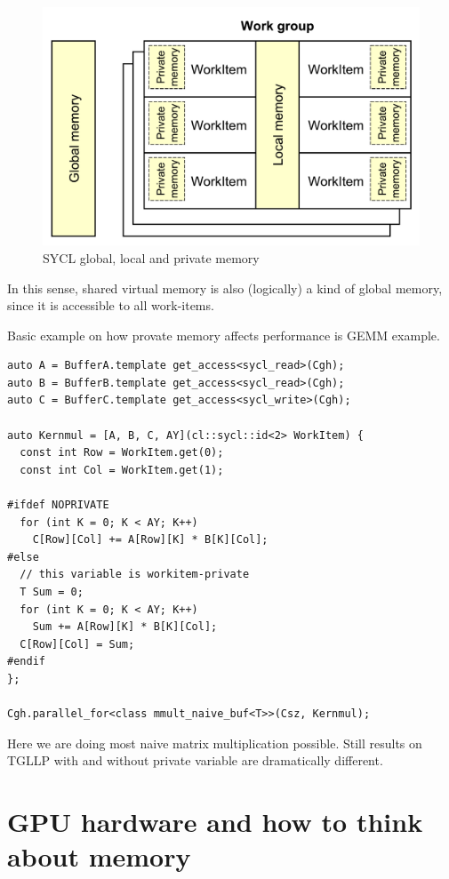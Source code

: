\documentclass[a4paper,12pt,oneside]{article}
\begin{document}
\begin{figure}
\centering
\includegraphics[width=1.0\textwidth]{pictures/sycl-privatemem.pdf}
\caption{SYCL global, local and private memory}
\label{fig:sycl-privatemem}
\end{figure}

In this sense, shared virtual memory is also (logically) a kind of global memory, since it is accessible to all work-items.

Basic example on how provate memory affects performance is GEMM example.

\begin{lstlisting}[caption={Naive GEMM with private memory},label={lst:gemmprivate}]
auto A = BufferA.template get_access<sycl_read>(Cgh);
auto B = BufferB.template get_access<sycl_read>(Cgh);
auto C = BufferC.template get_access<sycl_write>(Cgh);

auto Kernmul = [A, B, C, AY](cl::sycl::id<2> WorkItem) {
  const int Row = WorkItem.get(0);
  const int Col = WorkItem.get(1);

#ifdef NOPRIVATE
  for (int K = 0; K < AY; K++)
    C[Row][Col] += A[Row][K] * B[K][Col];
#else
  // this variable is workitem-private
  T Sum = 0;
  for (int K = 0; K < AY; K++)
    Sum += A[Row][K] * B[K][Col];
  C[Row][Col] = Sum;
#endif
};

Cgh.parallel_for<class mmult_naive_buf<T>>(Csz, Kernmul);
\end{lstlisting}

Here we are doing most naive matrix multiplication possible. Still results on TGLLP with and without private variable are dramatically different.


\section{GPU hardware and how to think about memory}\label{sec:GPUHW}
\end{document}
